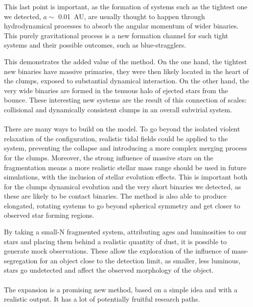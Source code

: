 This last point is important, as the formation of systems such as the tightest one we detected, $a \sim$ 0.01~AU, are usually thought to happen through hydrodynamical processes to absorb the angular momentum of wider binaries. This purely gravitational process is a new formation channel for such tight systems and their possible outcomes, such as blue-stragglers.

This demonstrates the added value of the \HubLem method. On the one hand, the tightest new binaries have massive primaries, they were then likely located in the heart of the clumps, exposed to substantial dynamical interaction. On the other hand, the very wide binaries are formed in the tenuous halo of ejected stars from the bounce. These interesting new systems are the result of this connection of scales: collisional and dynamically consistent clumps in an overall subvirial system.


\paragraph*{}
There are many ways to build on the \HubLem model. To go beyond the isolated violent relaxation of the configuration, realistic tidal fields could be applied to the system, preventing the collapse and introducing a more complex merging process for the clumps. Moreover, the strong influence of massive stars on the fragmentation means a more realistic stellar mass range should be used in future simulations, with the inclusion of stellar evolution effects. This is important both for the clumps dynamical evolution and the very short binaries we detected, as these are likely to be contact binaries. The \HubLem method is also able to produce elongated, rotating systems to go beyond spherical symmetry and get closer to observed star forming regions.

By taking a small-N fragmented system, attributing ages and luminosities to our stars and placing them behind a realistic quantity of dust, it is possible to generate mock observations. These allow the exploration of the influence of mass-segregation for an object close to the detection limit, as smaller, less luminous, stars go undetected and affect the observed morphology of the object.


\paragraph*{}
The \HubLem expansion is a promising new method, based on a simple idea and with a realistic output. It has a lot of potentially fruitful research paths.


